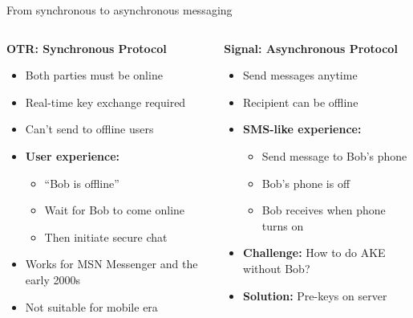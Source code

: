 \documentclass[aspectratio=169, lualatex, handout]{beamer}
\begin{document}
\begin{frame}{From synchronous to asynchronous messaging}
	\begin{columns}
		\begin{column}{0.5\textwidth}
			\textbf{OTR: Synchronous Protocol}
			\begin{itemize}
				\item Both parties must be online
				\item Real-time key exchange required
				\item Can't send to offline users
				\item \textbf{User experience:}
				      \begin{itemize}
					      \item ``Bob is offline''
					      \item Wait for Bob to come online
					      \item Then initiate secure chat
				      \end{itemize}
				\item Works for MSN Messenger and the early 2000s
				\item Not suitable for mobile era
			\end{itemize}
		\end{column}
		\begin{column}{0.5\textwidth}
			\textbf{Signal: Asynchronous Protocol}
			\begin{itemize}
				\item Send messages anytime
				\item Recipient can be offline
				\item \textbf{SMS-like experience:}
				      \begin{itemize}
					      \item Send message to Bob's phone
					      \item Bob's phone is off
					      \item Bob receives when phone turns on
				      \end{itemize}
				\item \textbf{Challenge:} How to do AKE without Bob?
				\item \textbf{Solution:} Pre-keys on server
			\end{itemize}
		\end{column}
	\end{columns}
\end{frame}
\end{document}
